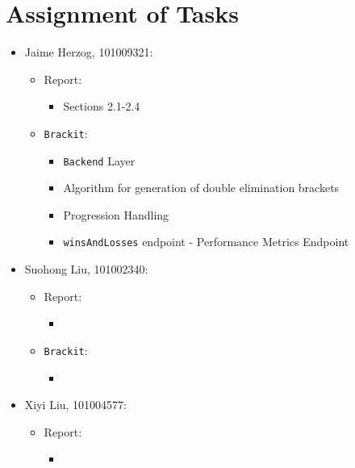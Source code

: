 \documentclass{article}
\begin{document}
\section{Assignment of Tasks}
\begin{itemize}
    \item{Jaime Herzog, 101009321: 
        \begin{itemize}
            \item{Report: 
                \begin{itemize}
                    \item{Sections 2.1-2.4}
                \end{itemize}
            }
            \item{\texttt{Brackit}: 
                \begin{itemize}
                    \item{\texttt{Backend} Layer}
                    \item{Algorithm for generation of double elimination brackets}
                    \item{Progression Handling}
                    \item{\texttt{winsAndLosses} endpoint - Performance Metrics Endpoint}
                \end{itemize}
            }
        \end{itemize}
    }
    \item{Suohong Liu, 101002340: 
        \begin{itemize}
            \item{Report: 
                \begin{itemize}
                    \item{}
                \end{itemize}
            }
            \item{\texttt{Brackit}: 
                \begin{itemize}
                    \item{}
                \end{itemize}
            }
        \end{itemize}
    }
    \item{Xiyi Liu, 101004577: 
        \begin{itemize}
            \item{Report: 
                \begin{itemize}
                    \item{}
                \end{itemize}
}
\end{itemize}}
\end{itemize}
\end{document}
